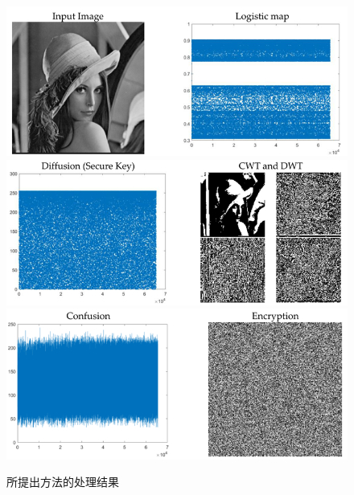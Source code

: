 \begin{figure}[ht]
    \begin{center}
        \includegraphics[width=\textwidth]{figure/p1.png}\\
        \includegraphics[width=\textwidth]{figure/p2.png}\\
        \includegraphics[width=\textwidth]{figure/p3.png}\\
    \end{center}
    \caption{所提出方法的处理结果 \label{fig:4.1}}
\end{figure}


